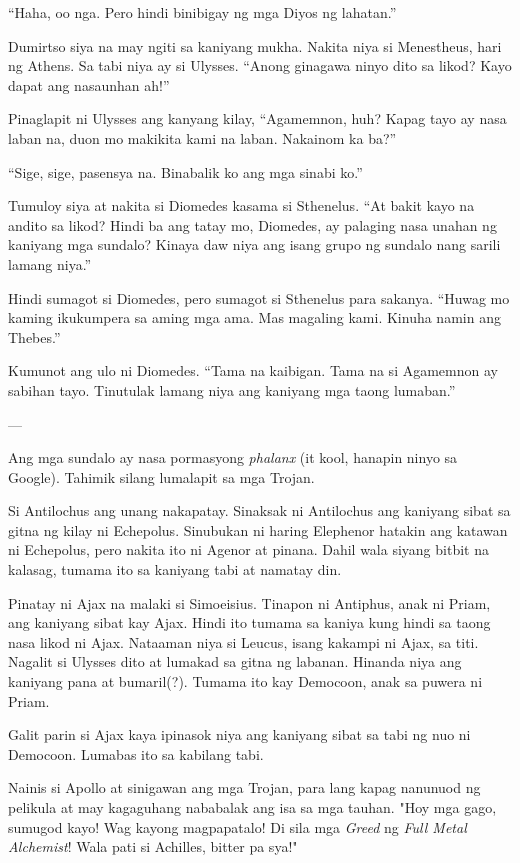 \documentclass[12pt,letterpaper]{report}
\begin{document}
``Haha, oo nga. Pero hindi binibigay ng mga Diyos ng lahatan.''

Dumirtso siya na may ngiti sa kaniyang mukha. Nakita niya si Menestheus, hari ng Athens. Sa tabi niya ay si Ulysses. ``Anong ginagawa ninyo dito sa likod? Kayo dapat ang nasaunhan ah!''

Pinaglapit ni Ulysses ang kanyang kilay, ``Agamemnon, huh? Kapag tayo ay nasa laban na, duon mo makikita kami na laban. Nakainom ka ba?''

``Sige, sige, pasensya na. Binabalik ko ang mga sinabi ko.''

Tumuloy siya at nakita si Diomedes kasama si Sthenelus. ``At bakit kayo na andito sa likod? Hindi ba ang tatay mo, Diomedes, ay palaging nasa unahan ng kaniyang mga sundalo? Kinaya daw niya ang isang grupo ng sundalo nang sarili lamang niya.''

Hindi sumagot si Diomedes, pero sumagot si Sthenelus para sakanya. ``Huwag mo kaming ikukumpera sa aming mga ama. Mas magaling kami. Kinuha namin ang Thebes.''

Kumunot ang ulo ni Diomedes. ``Tama na kaibigan. Tama na si Agamemnon ay sabihan tayo. Tinutulak lamang niya ang kaniyang mga taong lumaban.''

---

Ang mga sundalo ay nasa pormasyong \textit{phalanx} (it kool, hanapin ninyo sa Google). Tahimik silang lumalapit sa mga Trojan.

Si Antilochus ang unang nakapatay. Sinaksak ni Antilochus ang kaniyang sibat sa gitna ng kilay ni Echepolus. Sinubukan ni haring Elephenor hatakin ang katawan ni Echepolus, pero nakita ito ni Agenor at pinana. Dahil wala siyang bitbit na kalasag, tumama ito sa kaniyang tabi at namatay din.

Pinatay ni Ajax na malaki si Simoeisius. Tinapon ni Antiphus, anak ni Priam, ang kaniyang sibat kay Ajax. Hindi ito tumama sa kaniya kung hindi sa taong nasa likod ni Ajax. Nataaman niya si Leucus, isang kakampi ni Ajax, sa titi. Nagalit si Ulysses dito at lumakad sa gitna ng labanan. Hinanda niya ang kaniyang pana at bumaril(?). Tumama ito kay Democoon, anak sa puwera ni Priam.

Galit parin si Ajax kaya ipinasok niya ang kaniyang sibat sa tabi ng nuo ni Democoon. Lumabas ito sa kabilang tabi.

Nainis si Apollo at sinigawan ang mga Trojan, para lang kapag nanunuod ng pelikula at may kagaguhang nababalak ang isa sa mga tauhan. "Hoy mga gago, sumugod kayo! Wag kayong magpapatalo!
Di sila mga \textit{Greed} ng \textit{Full Metal Alchemist}! Wala pati si Achilles, bitter pa sya!"
\end{document}
